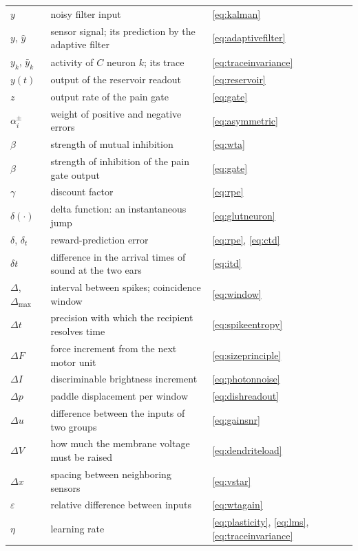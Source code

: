 \begin{center}
\begin{longtable}{>{\raggedright}p{2.0cm}>{\raggedright}p{9.6cm}>{\raggedright\arraybackslash}p{2.4cm}}
$y$ & noisy filter input & \eqref{eq:kalman} \\
$y$, $\hat y$ & sensor signal; its prediction by the adaptive filter & \eqref{eq:adaptivefilter} \\
$y_k$, $\bar y_k$ & activity of $C$ neuron $k$; its trace & \eqref{eq:traceinvariance} \\
$y(t)$ & output of the reservoir readout & \eqref{eq:reservoir} \\
$z$ & output rate of the pain gate & \eqref{eq:gate} \\
\midrule
$\alpha_i^\pm$ & weight of positive and negative errors & \eqref{eq:asymmetric} \\
$\beta$ & strength of mutual inhibition & \eqref{eq:wta} \\
$\beta$ & strength of inhibition of the pain gate output & \eqref{eq:gate} \\
$\gamma$ & discount factor & \eqref{eq:rpe} \\
$\delta(\cdot)$ & delta function: an instantaneous jump & \eqref{eq:glutneuron} \\
$\delta$, $\delta_t$ & reward-prediction error & \eqref{eq:rpe}, \eqref{eq:ctd} \\
$\delta t$ & difference in the arrival times of sound at the two ears & \eqref{eq:itd} \\
$\Delta$, $\Delta_{\max}$ & interval between spikes; coincidence window & \eqref{eq:window} \\
$\Delta t$ & precision with which the recipient resolves time & \eqref{eq:spikeentropy} \\
$\Delta F$ & force increment from the next motor unit & \eqref{eq:sizeprinciple} \\
$\Delta I$ & discriminable brightness increment & \eqref{eq:photonnoise} \\
$\Delta p$ & paddle displacement per window & \eqref{eq:dishreadout} \\
$\Delta u$ & difference between the inputs of two groups & \eqref{eq:gainsnr} \\
$\Delta V$ & how much the membrane voltage must be raised & \eqref{eq:dendriteload} \\
$\Delta x$ & spacing between neighboring sensors & \eqref{eq:vstar} \\
$\varepsilon$ & relative difference between inputs & \eqref{eq:wtagain} \\
$\eta$ & learning rate & \eqref{eq:plasticity}, \eqref{eq:lms}, \eqref{eq:traceinvariance} \\

\end{longtable}
\end{center}
